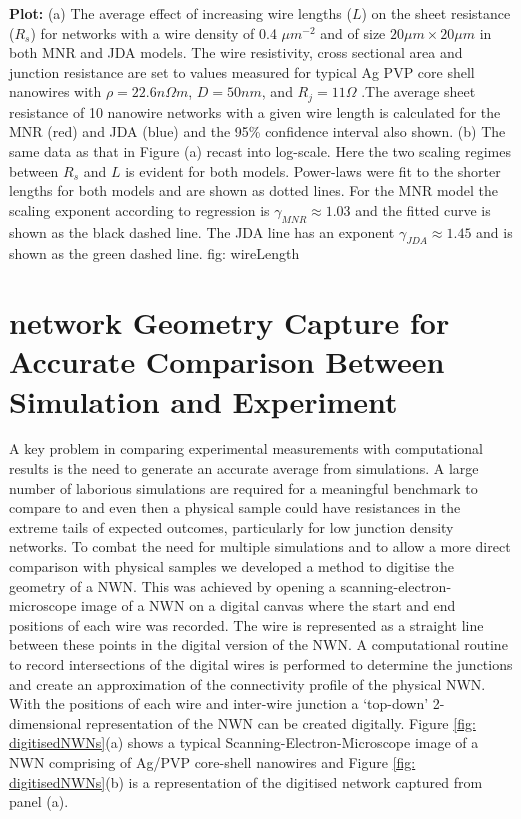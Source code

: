 {\textbf{Plot:} }
{(a) The average effect of increasing wire lengths ($L$) on the sheet resistance ($R_s$) for networks with a wire density of 0.4 $\mu m^{-2}$ and of size $20\mu m \times 20 \mu m$ in both MNR and JDA models. The wire resistivity, cross sectional area and junction resistance are set to values measured for typical Ag PVP core shell nanowires with $\rho = 22.6 n \Omega m$, $D = 50 nm$, and $R_j = 11 \Omega$ \cite{rocha2015}.The average sheet resistance of 10 nanowire networks with a given wire length is calculated for the MNR (red) and JDA (blue) and the 95\% confidence interval also shown. (b) The same data as that in Figure (a) recast into log-scale. Here the two scaling regimes between $R_s$ and $L$ is evident for both models. Power-laws were fit to the shorter lengths for both models and are shown as dotted lines. For the MNR model the scaling exponent according to regression is $\gamma_{MNR} \approx 1.03$ and the fitted curve is shown as the black dashed line. The JDA line has an exponent $\gamma_{JDA} \approx 1.45$ and is shown as the green dashed line. }
{fig: wireLength}

\section{network Geometry Capture for Accurate Comparison Between Simulation and Experiment}
\label{sec:image_proc}

A key problem in comparing experimental measurements with computational results is the need to generate an accurate average from simulations. A large number of laborious simulations are required for a meaningful benchmark to compare to and even then a physical sample could have resistances in the extreme tails of expected outcomes, particularly for low junction density networks. To combat the need for multiple simulations and to allow a more direct comparison with physical samples we developed a method to digitise the geometry of a NWN. This was achieved by opening a scanning-electron-microscope image of a NWN on a digital canvas where the start and end positions of each wire was recorded. The wire is represented as a straight line between these points in the digital version of the NWN. A computational routine to record intersections of the digital wires is performed to determine the junctions and create an approximation of the connectivity profile of the physical NWN. With the positions of each wire and inter-wire junction a `top-down' 2-dimensional representation of the NWN can be created digitally. Figure \ref{fig: digitisedNWNs}(a) shows a typical Scanning-Electron-Microscope image of a NWN comprising of Ag/PVP core-shell nanowires and Figure \ref{fig: digitisedNWNs}(b) is a representation of the digitised network captured from panel (a). 

